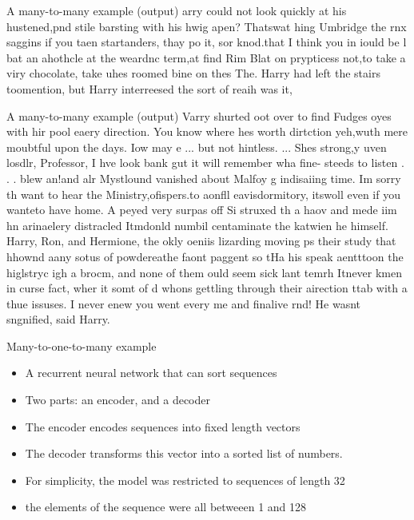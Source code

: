\documentclass[10pt]{beamer}
\begin{document}
\begin{frame}{A many-to-many example (output)}
  arry could not look quickly at his hustened,pnd stile barsting with his hwig apen? Thatswat hing Umbridge the rnx saggins if you taen startanders, thay po it, sor knod.that  I think you  in iould be l bat an ahothcle at the weardnc term,at find Rim   Blat on prypticess not,to take a viry chocolate, take uhes roomed bine on thes The. Harry had left the stairs toomention, but Harry interreesed the sort of reaih was it,
\end{frame}

\begin{frame}{A many-to-many example (output)}
  Varry shurted oot over to find Fudges oyes with hir pool eaery direction. You know where hes worth dirtction yeh,wuth mere moubtful upon the days. Iow may e ... but not hintless. ... Shes strong,y uven losdlr, Professor, I hve look bank  gut it will remember wha fine- steeds to listen . . . blew an!and alr Mystlound vanished about Malfoy g indisaiing time. Im sorry th want to hear the Ministry,ofispers.to aonfll eavisdormitory, itswoll even if you  wanteto have home. A  peyed  very surpas off   Si  struxed th a haov and mede iim hn arinaelery distracled  Itmdonld numbil centaminate the katwien he himself. Harry, Ron, and Hermione, the okly oeniis lizarding moving ps their study that hhownd aany sotus of powdereathe faont paggent so tHa his speak aentttoon the higlstryc  igh a brocm, and none of them  ould seem sick lant temrh Itnever kmen in curse  fact, wher it somt of d whons gettling through their airection ttab with a thue issuses. I never enew you went every me and finalive rnd! He wasnt sngnified, said Harry.
\end{frame}



\begin{frame}{Many-to-one-to-many example}


\begin{itemize}
\item  A recurrent neural network that can sort sequences
\item Two parts: an encoder, and a decoder
\item The encoder encodes sequences into fixed length vectors
\item The decoder transforms this vector into a sorted list of numbers.
\item For simplicity, the model was restricted to sequences of length 32
\item the elements of the sequence were all betweeen 1 and 128
\end{itemize}

 \end{frame}
\end{document}
